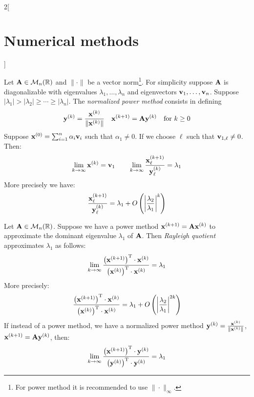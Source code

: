 \documentclass[../../../main_math.tex]{subfiles}
\begin{document}
\begin{multicols}{2}[\section{Numerical methods}]
\begin{method}
  \end{method}
  \begin{method}
    Let $\boldsymbol{\mathrm{A}}\in\mathcal{M}_n(\mathbb{R})$ and $\|\cdot\|$ be a vector norm\footnote{For power method it is recommended to use $\|\cdot\|_\infty$.}. For simplicity suppose $\boldsymbol{\mathrm{A}}$ is diagonalizable with eigenvalues $\lambda_1,\ldots,\lambda_n$ and eigenvectors $\boldsymbol{\mathrm{v}}_1,\ldots,\boldsymbol{\mathrm{v}}_n$. Suppose $|\lambda_1|>|\lambda_2|\geq\cdots\geq|\lambda_n|$. The \emph{normalized power method} consists in defining $$\boldsymbol{\mathrm{y}}^{(k)}=\frac{\boldsymbol{\mathrm{x}}^{(k)}}{\|\boldsymbol{\mathrm{x}}^{(k)}\|}\quad\boldsymbol{\mathrm{x}}^{(k+1)}=\boldsymbol{\mathrm{A}}\boldsymbol{\mathrm{y}}^{(k)}\quad\text{for }k\geq 0$$ Suppose $\boldsymbol{\mathrm{x}}^{(0)}=\sum_{i=1}^n\alpha_i\boldsymbol{\mathrm{v}}_i$ such that $\alpha_1\ne0$. If we choose $\ell$ such that $\boldsymbol{\mathrm{v}}_{1,\ell}\ne0$. Then: $$\lim_{k\to\infty}\boldsymbol{\mathrm{x}}^{(k)}=\boldsymbol{\mathrm{v}}_1\qquad\lim_{k\to\infty}\frac{\boldsymbol{\mathrm{x}}_\ell^{(k+1)}}{\boldsymbol{\mathrm{y}}_\ell^{(k)}}=\lambda_1$$ More precisely we have: $$\frac{\boldsymbol{\mathrm{x}}_\ell^{(k+1)}}{\boldsymbol{\mathrm{y}}_\ell^{(k)}}=\lambda_1+O\left(\left|\frac{\lambda_2}{\lambda_1}\right|^k\right)$$
  \end{method}
  \begin{method}
    Let $\boldsymbol{\mathrm{A}}\in\mathcal{M}_n(\mathbb{R})$. Suppose we have a power method $\boldsymbol{\mathrm{x}}^{(k+1)}=\boldsymbol{\mathrm{A}}\boldsymbol{\mathrm{x}}^{(k)}$ to approximate the dominant eigenvalue $\lambda_1$ of $\boldsymbol{\mathrm{A}}$. Then \emph{Rayleigh quotient} approximates $\lambda_1$ as follows: $$\lim_{k\to\infty}\frac{\left(\boldsymbol{\mathrm{x}}^{(k+1)}\right)^\mathrm{T}\cdot \boldsymbol{\mathrm{x}}^{(k)}}{\left(\boldsymbol{\mathrm{x}}^{(k)}\right)^\mathrm{T}\cdot\boldsymbol{\mathrm{x}}^{(k)}}=\lambda_1$$
    More precisely: $$\frac{\left(\boldsymbol{\mathrm{x}}^{(k+1)}\right)^\mathrm{T}\cdot \boldsymbol{\mathrm{x}}^{(k)}}{\left(\boldsymbol{\mathrm{x}}^{(k)}\right)^\mathrm{T}\cdot\boldsymbol{\mathrm{x}}^{(k)}}=\lambda_1+O\left(\left|\frac{\lambda_2}{\lambda_1}\right|^{2k}\right)$$ If instead of a power method, we have a normalized power method $\boldsymbol{\mathrm{y}}^{(k)}=\frac{\boldsymbol{\mathrm{x}}^{(k)}}{\|\boldsymbol{\mathrm{x}}^{(k)}\|}$, $\boldsymbol{\mathrm{x}}^{(k+1)}=\boldsymbol{\mathrm{A}}\boldsymbol{\mathrm{y}}^{(k)}$, then: $$\lim_{k\to\infty}\frac{\left(\boldsymbol{\mathrm{x}}^{(k+1)}\right)^\mathrm{T}\cdot \boldsymbol{\mathrm{y}}^{(k)}}{\left(\boldsymbol{\mathrm{y}}^{(k)}\right)^\mathrm{T}\cdot\boldsymbol{\mathrm{y}}^{(k)}}=\lambda_1$$
  \end{method}
  \begin{method}

\end{method}
\end{multicols}
\end{document}
